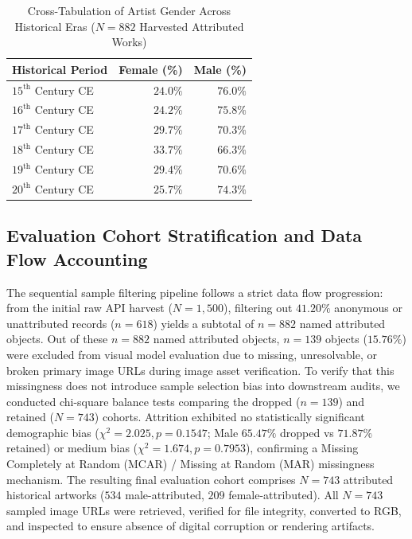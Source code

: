 \documentclass[pdflatex,sn-mathphys-num]{sn-jnl}%
\theoremstyle{thmstyleone}%
\theoremstyle{thmstyletwo}%
\theoremstyle{thmstylethree}%
\begin{document}
\begin{table}[h]
\caption{Cross-Tabulation of Artist Gender Across Historical Eras ($N=882$ Harvested Attributed Works)}
\label{tab:temporal_gender}
\centering
\small
\begin{tabular}{lrr}
\toprule
\textbf{Historical Period} & \textbf{Female (\%)} & \textbf{Male (\%)} \\
\midrule
$15^{\text{th}}$ Century CE & $24.0\%$ & $76.0\%$ \\
$16^{\text{th}}$ Century CE & $24.2\%$ & $75.8\%$ \\
$17^{\text{th}}$ Century CE & $29.7\%$ & $70.3\%$ \\
$18^{\text{th}}$ Century CE & $33.7\%$ & $66.3\%$ \\
$19^{\text{th}}$ Century CE & $29.4\%$ & $70.6\%$ \\
$20^{\text{th}}$ Century CE & $25.7\%$ & $74.3\%$ \\
\bottomrule
\end{tabular}
\end{table}

\subsection{Evaluation Cohort Stratification and Data Flow Accounting}
The sequential sample filtering pipeline follows a strict data flow progression: from the initial raw API harvest ($N=1,500$), filtering out $41.20\%$ anonymous or unattributed records ($n=618$) yields a subtotal of $n=882$ named attributed objects. Out of these $n=882$ named attributed objects, $n=139$ objects ($15.76\%$) were excluded from visual model evaluation due to missing, unresolvable, or broken primary image URLs during image asset verification. To verify that this missingness does not introduce sample selection bias into downstream audits, we conducted chi-square balance tests comparing the dropped ($n=139$) and retained ($N=743$) cohorts. Attrition exhibited no statistically significant demographic bias ($\chi^2 = 2.025, p = 0.1547$; Male $65.47\%$ dropped vs $71.87\%$ retained) or medium bias ($\chi^2 = 1.674, p = 0.7953$), confirming a Missing Completely at Random (MCAR) / Missing at Random (MAR) missingness mechanism. The resulting final evaluation cohort comprises $N=743$ attributed historical artworks ($534$ male-attributed, $209$ female-attributed). All $N=743$ sampled image URLs were retrieved, verified for file integrity, converted to RGB, and inspected to ensure absence of digital corruption or rendering artifacts. 
\end{document}
